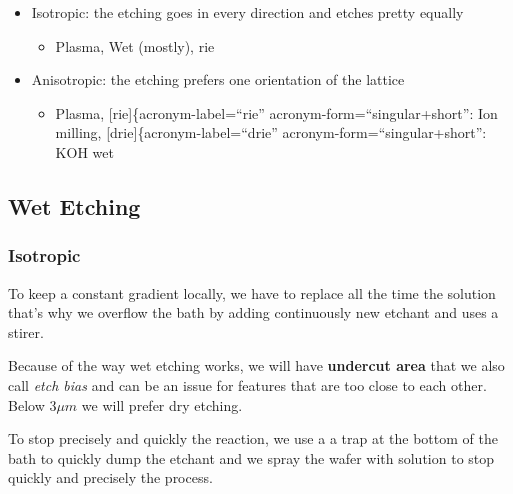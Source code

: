 \documentclass[
]{article}
\providecommand{\tightlist}{%
  \setlength{\itemsep}{0pt}\setlength{\parskip}{0pt}}
\begin{document}
\begin{itemize}
\item
  Isotropic: the etching goes in every direction and etches pretty
  equally

  \begin{itemize}
  \tightlist
  \item
    Plasma, Wet (mostly), {rie}
  \end{itemize}
\item
  Anisotropic: the etching prefers one orientation of the lattice

  \begin{itemize}
  \tightlist
  \item
    Plasma, {[}rie{]}\{acronym-label=``rie''
    acronym-form=``singular+short'': Ion milling,
    {[}drie{]}\{acronym-label=``drie'' acronym-form=``singular+short'':
    KOH wet
  \end{itemize}
\end{itemize}

\hypertarget{wet-etching}{%
\subsection{Wet Etching}\label{wet-etching}}

\hypertarget{isotropic}{%
\subsubsection{Isotropic}\label{isotropic}}

To keep a constant gradient locally, we have to replace all the time the
solution that's why we overflow the bath by adding continuously new
etchant and uses a stirer.

Because of the way wet etching works, we will have \textbf{undercut
area} that we also call \emph{etch bias} and can be an issue for
features that are too close to each other. Below \(3 \mu m\) we will
prefer dry etching.

To stop precisely and quickly the reaction, we use a a trap at the
bottom of the bath to quickly dump the etchant and we spray the wafer
with solution to stop quickly and precisely the process.
\end{document}
